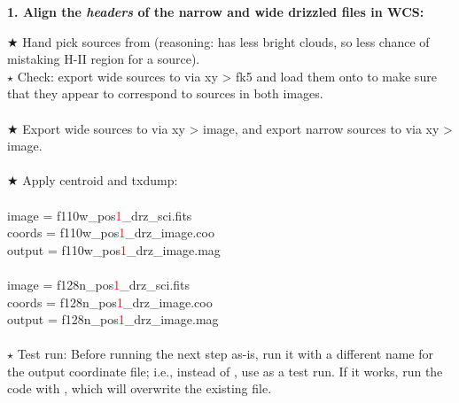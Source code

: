 \documentclass[11pt,obeyspaces]{article} %
\begin{document}
\begin{shaded}
{\bf 1. Align the \textit{headers} of the narrow and wide drizzled files in WCS:}

$\bigstar$ Hand pick sources from \textcolor{red}{} (reasoning: has less bright clouds, so less chance of mistaking H-II region for a source). \\
$\star$ Check: export wide sources to \textcolor{red}{} via xy > fk5 and load them onto \textcolor{red}{} to make sure that they appear to correspond to sources in both images. \\ \\
$\bigstar$ Export wide sources to \textcolor{red}{} via xy > image, and export narrow sources to \textcolor{red}{} via xy > image. \\ \\
$\bigstar$ Apply centroid and txdump: \\
 \\
image = { f110w\_pos\textcolor{red}{1}\_drz\_sci.fits} \\ 
coords = {f110w\_pos\textcolor{red}{1}\_drz\_image.coo} \\
output = {f110w\_pos\textcolor{red}{1}\_drz\_image.mag} \\
 \\
image = { f128n\_pos\textcolor{red}{1}\_drz\_sci.fits} \\ 
coords = {f128n\_pos\textcolor{red}{1}\_drz\_image.coo} \\
output = {f128n\_pos\textcolor{red}{1}\_drz\_image.mag} \\ \\
$\star$ Test run: Before running the next step as-is, run it with a different name for the output coordinate file; i.e., instead of , use  as a test run. If it works, run the code with , which will overwrite the existing file. \\ \\
\textcolor{red}{}\textcolor{red}{} \\ 
\textcolor{red}{}\textcolor{red}{} \\ \\

\end{shaded}
\end{document}
